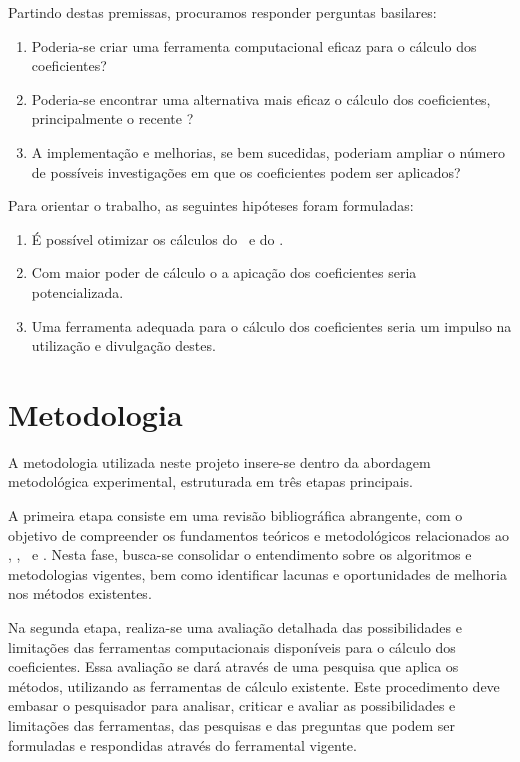 Partindo destas premissas, procuramos responder perguntas basilares:

\begin{enumerate}
    \label{enum:quest}
    \item Poderia-se criar uma ferramenta computacional eficaz para o cálculo dos coeficientes?
    \item Poderia-se encontrar uma alternativa mais eficaz o cálculo dos coeficientes, principalmente o recente \dmc?
    \item A implementação e melhorias, se bem sucedidas, poderiam ampliar o número de possíveis investigações em que os coeficientes podem ser aplicados?
\end{enumerate}

Para orientar o trabalho, as seguintes hipóteses foram formuladas:

\begin{enumerate}
    \item É possível otimizar os cálculos do \pdcca~e do \dmc.
    \item Com maior poder de cálculo o a apicação dos coeficientes seria potencializada.
	\item Uma ferramenta adequada para o cálculo dos coeficientes seria um impulso na utilização e divulgação destes.
\end{enumerate}

\section{Metodologia}
\label{sec:metodologia}

A metodologia utilizada neste projeto insere-se dentro da abordagem metodológica experimental, estruturada em três etapas principais.

A primeira etapa consiste em uma revisão bibliográfica abrangente, com o objetivo de compreender os fundamentos teóricos e metodológicos relacionados ao \dfa, \dcca, \pdcca~e \dmc. Nesta fase, busca-se consolidar o entendimento sobre os algoritmos e metodologias vigentes, bem como identificar lacunas e oportunidades de melhoria nos métodos existentes.

Na segunda etapa, realiza-se uma avaliação detalhada das possibilidades e limitações das ferramentas computacionais disponíveis para o cálculo dos coeficientes. Essa avaliação se dará através de uma pesquisa que aplica os métodos, utilizando as ferramentas de cálculo existente. Este procedimento deve embasar o pesquisador para analisar, criticar e avaliar as possibilidades e limitações das ferramentas, das pesquisas e das preguntas que podem ser formuladas e respondidas através do ferramental vigente.

